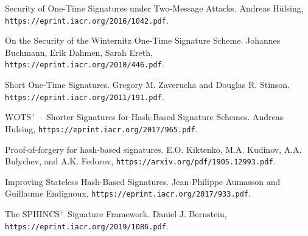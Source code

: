 \documentclass[a4paper, 14pt]{extarticle}
\begin{document}
\begin{thebibliography}{9}
    Security of One-Time Signatures under Two-Message Attacks. Andreas Hülsing,
    \texttt{https://eprint.iacr.org/2016/1042.pdf}.
    
    On the Security of the Winternitz One-Time Signature Scheme. Johannes Buchmann, Erik Dahmen, Sarah Ereth,
    \texttt{https://eprint.iacr.org/2010/446.pdf}.

    Short One-Time Signatures. Gregory M. Zaverucha and Douglas R. Stinson.
    \texttt{https://eprint.iacr.org/2011/191.pdf}.

    $\text{WOTS}^{+}$ – Shorter Signatures for Hash-Based Signature Schemes. Andreas Hulsing,
    \texttt{https://eprint.iacr.org/2017/965.pdf}.

    Proof-of-forgery for hash-based signatures. E.O. Kiktenko, M.A. Kudinov, A.A. Bulychev, and A.K. Fedorov,
    \texttt{https://arxiv.org/pdf/1905.12993.pdf}.

    Improving Stateless Hash-Based Signatures. Jean-Philippe Aumasson and Guillaume Endignoux,
    \texttt{https://eprint.iacr.org/2017/933.pdf}.

    The $\text{SPHINCS}^{+}$ Signature Framework. Daniel J. Bernstein,
    \texttt{https://eprint.iacr.org/2019/1086.pdf}.
\end{thebibliography}
\newpage

\end{document}
